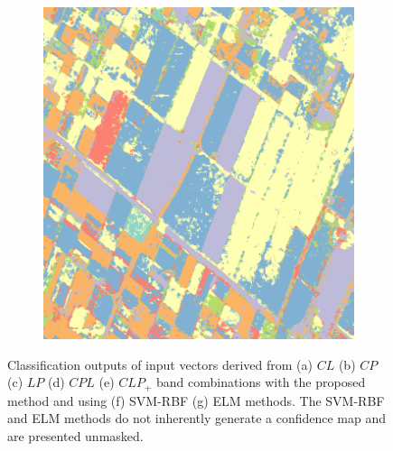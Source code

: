 \begin{figure}[tbp]
\begin{subfigure}[b]{0.24\textwidth}
                  \caption{}
                  \label{fig:SVM}
        \end{subfigure}
        ~
        \begin{subfigure}[b]{0.24\textwidth}
                        \includegraphics[width=\textwidth]{Figures/Kron/ELM_COLOR}
                        \caption{}
                        \label{fig:ELM}
        \end{subfigure}
    \caption{Classification outputs of input vectors derived from (a) $CL$ (b) $CP$ (c) $LP$ (d) $CPL$ (e) $CLP_{+}$ band combinations with the proposed method and using (f) SVM-RBF (g) ELM methods. The SVM-RBF and ELM methods do not inherently generate a confidence map and are presented unmasked.}\label{fig:MultiFreq}
\end{figure}

